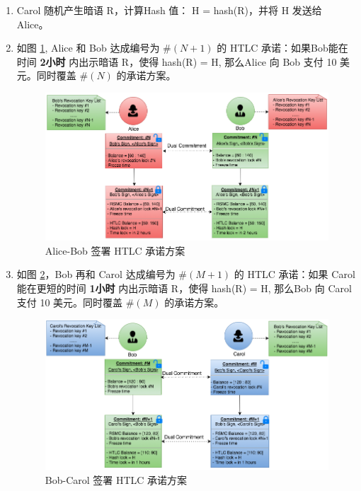 \begin{enumerate}
    \item Carol 随机产生暗语 R，计算Hash 值： H = hash(R)，并将 H 发送给 Alice。

    \item 如图 \ref{fig:htlc_alice_bob_2}, Alice 和 Bob 达成编号为 $\#(N+1)$ 的 HTLC 承诺：如果Bob能在时间 \textbf{2小时} 内出示暗语 R，使得 hash(R) = H, 那么Alice 向 Bob 支付 10 美元。同时覆盖 $\#(N)$ 的承诺方案。 
        \begin{figure}[h!]
            \centering
            \includegraphics[width=12cm, keepaspectratio]{../images/alice_bob_2.png}
            \caption{Alice-Bob 签署 HTLC 承诺方案}
            \label{fig:htlc_alice_bob_2}
        \end{figure}

    \item 如图 \ref{fig:htlc_bob_carol_2}，Bob 再和 Carol 达成编号为 $\#(M+1)$ 的 HTLC 承诺：如果 Carol 能在更短的时间 \textbf{1小时} 内出示暗语 R，使得 hash(R) = H, 那么Bob 向 Carol 支付 10 美元。同时覆盖 $\#(M)$ 的承诺方案。
        \begin{figure}[h!]
            \centering
            \includegraphics[width=12cm, keepaspectratio]{../images/bob_carol_2.png}
            \caption{Bob-Carol 签署 HTLC 承诺方案}
            \label{fig:htlc_bob_carol_2}
        \end{figure}


\end{enumerate}
